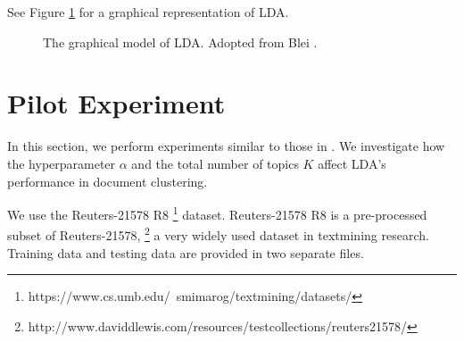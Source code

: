 \documentclass{article}
\begin{document}
See Figure \ref{fig:gaphical_model_lda} for a graphical representation of LDA.

\begin{figure}[h]
  \centering
  \caption{The graphical model of LDA. Adopted from Blei \cite{blei2012probablistic}.}
  \label{fig:gaphical_model_lda}
\end{figure}





\section{Pilot Experiment}

In this section, we perform experiments similar to those in \cite{lu2011investigating}. We investigate how the hyperparameter $\alpha$ and the total number of topics $K$ affect LDA's performance in document clustering.

We use the Reuters-21578 R8 \footnote{https://www.cs.umb.edu/~smimarog/textmining/datasets/} dataset. Reuters-21578 R8 is a pre-processed subset of Reuters-21578, \footnote{http://www.daviddlewis.com/resources/testcollections/reuters21578/} a very widely used dataset in textmining research. Training data and testing data are provided in two separate files.
\end{document}
